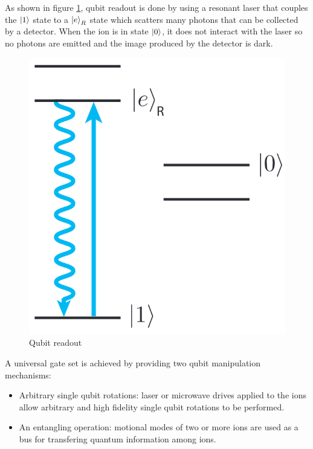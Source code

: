 As shown in figure \ref{fig:QubitReadout}, qubit readout is done by using a resonant laser that couples the $\left|{1}\right\rangle$ state to a $\left|{e}\right\rangle_{R}$ state which scatters many photons that can be collected by a detector. When the ion is in state $\left|{0}\right\rangle$, it does not interact with the laser so no photons are emitted and the image produced by the detector is dark.

\begin{figure}[h!]
    \centering
    \includegraphics[scale=.25]{images/TrappedIons-QubitReadout.png}
    \caption{Qubit readout \cite{TrappedIonQuantumComputing_2019}}
    \label{fig:QubitReadout}
\end{figure}

A universal gate set is achieved by providing two qubit manipulation mechanisms:
\begin{itemize}[noitemsep,nolistsep]
    \item Arbitrary single qubit rotations: laser or microwave drives applied to the ions allow arbitrary and high fidelity single qubit rotations to be performed.
    \item An entangling operation: motional modes of two or more ions are used as a bus for transfering quantum information among ions.
\end{itemize}

